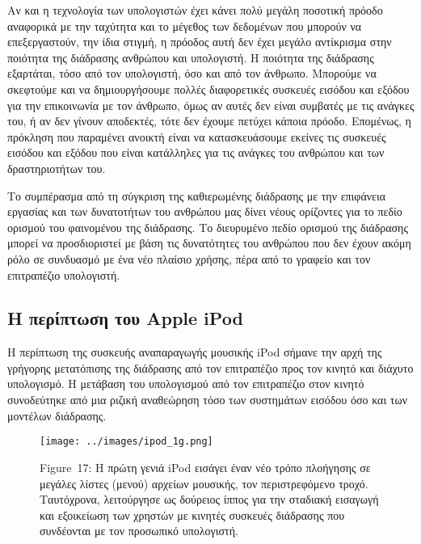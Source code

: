 \documentclass[
]{article}
\begin{document}
Αν και η τεχνολογία των υπολογιστών έχει κάνει πολύ μεγάλη ποσοτική
πρόοδο αναφορικά με την ταχύτητα και το μέγεθος των δεδομένων που
μπορούν να επεξεργαστούν, την ίδια στιγμή, η πρόοδος αυτή δεν έχει
μεγάλο αντίκρισμα στην ποιότητα της διάδρασης ανθρώπου και υπολογιστή. Η
ποιότητα της διάδρασης εξαρτάται, τόσο από τον υπολογιστή, όσο και από
τον άνθρωπο. Μπορούμε να σκεφτούμε και να δημιουργήσουμε πολλές
διαφορετικές συσκευές εισόδου και εξόδου για την επικοινωνία με τον
άνθρωπο, όμως αν αυτές δεν είναι συμβατές με τις ανάγκες του, ή αν δεν
γίνουν αποδεκτές, τότε δεν έχουμε πετύχει κάποια πρόοδο. Επομένως, η
πρόκληση που παραμένει ανοικτή είναι να κατασκευάσουμε εκείνες τις
συσκευές εισόδου και εξόδου που είναι κατάλληλες για τις ανάγκες του
ανθρώπου και των δραστηριοτήτων του.

Το συμπέρασμα από τη σύγκριση της καθιερωμένης διάδρασης με την
επιφάνεια εργασίας και των δυνατοτήτων του ανθρώπου μας δίνει νέους
ορίζοντες για το πεδίο ορισμού του φαινομένου της διάδρασης. Το
διευρυμένο πεδίο ορισμού της διάδρασης μπορεί να προσδιοριστεί με βάση
τις δυνατότητες του ανθρώπου που δεν έχουν ακόμη ρόλο σε συνδυασμό με
ένα νέο πλαίσιο χρήσης, πέρα από το γραφείο και τον επιτραπέζιο
υπολογιστή.

\hypertarget{ux3b7-ux3c0ux3b5ux3c1ux3afux3c0ux3c4ux3c9ux3c3ux3b7-ux3c4ux3bfux3c5-apple-ipod}{%
\subsection{Η περίπτωση του Apple
iPod}\label{ux3b7-ux3c0ux3b5ux3c1ux3afux3c0ux3c4ux3c9ux3c3ux3b7-ux3c4ux3bfux3c5-apple-ipod}}

Η περίπτωση της συσκευής αναπαραγωγής μουσικής iPod σήμανε την αρχή της
γρήγορης μετατόπισης της διάδρασης από τον επιτραπέζιο προς τον κινητό
και διάχυτο υπολογισμό. Η μετάβαση του υπολογισμού από τον επιτραπέζιο
στον κινητό συνοδεύτηκε από μια ριζική αναθεώρηση τόσο των συστημάτων
εισόδου όσο και των μοντέλων διάδρασης.

\leavevmode{}%
\begin{figure}
\hypertarget{fig:ipod_1g}{%
\centering
\texttt{[image: ../images/ipod\_1g.png]}
\caption{Figure~17: Η πρώτη γενιά iPod εισάγει έναν νέο τρόπο πλοήγησης
σε μεγάλες λίστες (μενού) αρχείων μουσικής, τον περιστρεφόμενο τροχό.
Ταυτόχρονα, λειτούργησε ως δούρειος ίππος για την σταδιακή εισαγωγή και
εξοικείωση των χρηστών με κινητές συσκευές διάδρασης που συνδέονται με
τον προσωπικό υπολογιστή.}\label{fig:ipod_1g}
}
\end{figure}
\end{document}
